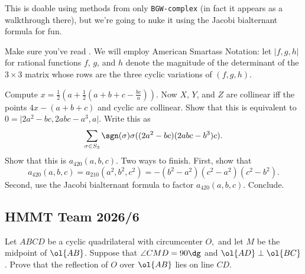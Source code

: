 \documentclass[11pt]{scrartcl}
\begin{document}
\begin{walkthrough}
	This is doable using methods from only \texttt{BGW-complex} (in fact it appears as a walkthrough there), but we're going to nuke it using the Jacobi bialternant formula for fun.

	Make sure you've read . We will employ American Smartass Notation: let $\lvert f,g,h\rvert$ for rational functions $f$, $g$, and $h$ denote the magnitude of the determinant of the $3 \times 3$ matrix whose rows are the three cyclic variations of $(f,g,h)$.

	\begin{walk}
		\ii Compute $x = \frac12(a + \frac12(a + b + c - \frac{bc}a))$.
		\ii Now $X$, $Y$, and $Z$ are collinear iff the points $4x - (a + b + c)$ and cyclic are collinear. Show that this is equivalent to $0 = \lvert 2a^2 - bc,2abc - a^3,a\rvert$.
		\ii Write this as
		\[\sum_{\sigma \in S_3}\sgn(\sigma)\sigma((2a^2 - bc)(2abc - b^3)c).\]
		Show that this is $a_{420}(a,b,c)$.
		\ii Two ways to finish. First, show that
		\[a_{420}(a,b,c) = a_{210}(a^2,b^2,c^2) = -(b^2 - a^2)(c^2 - a^2)(c^2 - b^2).\]
		Second, use the Jacobi bialternant formula to factor $a_{420}(a,b,c)$. Conclude.
	\end{walk}
\end{walkthrough}

\pagebreak

\subsection{HMMT Team 2026/6}

\begin{example}
	Let $ABCD$ be a cyclic quadrilateral with circumcenter $O,$ and let $M$ be the midpoint of $\ol{AB}$. Suppose that $\angle CMD = 90\dg$ and $\ol{AD} \perp \ol{BC}$. Prove that the reflection of $O$ over $\ol{AB}$ lies on line $CD$.
\end{example}
\end{document}
